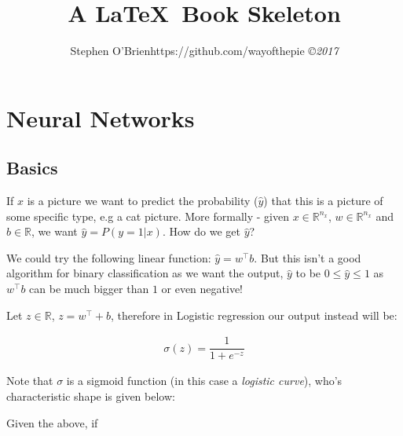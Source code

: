 \documentclass[12pt,reqno]{book}      %
\title{A \LaTeX \ Book Skeleton  }
\author{\htmladdnormallink           %
{Stephen O'Brien}{https://github.com/wayofthepie}
{\small\em \copyright 2017 }}
\date{ }
\begin{document}
\maketitle
{}
\tableofcontents

\chapter{Neural Networks}
\section{Basics}
If $x$ is a picture we want to predict the probability ($\hat{y}$) that this is a picture of some specific type, e.g a cat picture. More formally - given $x \in \mathbb{R}^{n_{x}}$, $w \in \mathbb{R}^{n_{x}}$ and 
$b \in \mathbb{R}$, we want $\hat{y} = P(y=1 | x)$. How do we get $\hat{y}$?

We could try the following linear function: $\hat{y} = w^\intercal b$. But this isn't a good algorithm for binary classification as we want the output, $\hat{y}$ to be $0 \leq \hat{y} \leq 1$ as $w^\intercal b$ can be much bigger than $1$ or even negative!

Let $z \in \mathbb{R}$,  $z = w^\intercal + b$, therefore in Logistic regression our output instead will be:

\begin{align}
\sigma(z) = \dfrac{1}{1 + e^{-z}}
\end{align}

Note that $\sigma$ is a sigmoid function (in this case a \textit{logistic curve}), who's characteristic shape is given below:

\begin{center}
\end{center}

Given the above, if
\end{document}

